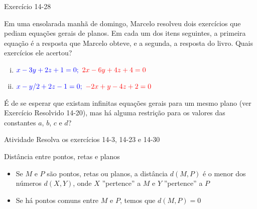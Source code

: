 \begin{frame}{Exercício 14-28}
    \begin{minipage}{\textwidth}
        Em uma ensolarada manhã de domingo, Marcelo resolveu dois exercícios que
        pediam equações gerais de planos. Em cada um dos itens seguintes, a primeira equação
        é a resposta que Marcelo obteve, e a segunda, a resposta do livro. Quais exercícios
        ele acertou?
    \end{minipage}
    \begin{enumerate}[(i)]
        \item \(\color{blue} x-3y+2z+1=0; ~ \color{red} 2x-6y+4z+4=0\)
        \item \(\color{blue} x-y/2+2z-1=0; ~ \color{red} -2x+y-4z+2=0\)
    \end{enumerate}

    \vspace {1.5cm}
    \pause

    \begin{tcolorbox}[colback=magenta!25]
    É de se esperar que existam infinitas equações gerais para um mesmo plano (ver Exercício Resolvido 14-20),
    mas há alguma restrição para os valores das constantes \(a\), \(b\), \(c\) e \(d\)?

    \end{tcolorbox}

\end{frame}

\begin{frame}{Atividade}
    Resolva os exercícios 14-3, 14-23 e 14-30
\end{frame}

\begin{frame}[c]{Distância entre pontos, retas e planos}
    \begin{itemize}
        \item Se \(M\) e \(P\) são pontos, retas ou planos, a distância \(d(M,P)\) é
            o menor dos números \(d(X,Y)\), onde \(X\) ''pertence'' a \(M\) e 
            \(Y\) ''pertence'' a \(P\)
        \item Se há pontos comuns entre \(M\) e \(P\), temos que \(d(M,P)=0\)
    \end{itemize}
\end{frame}

